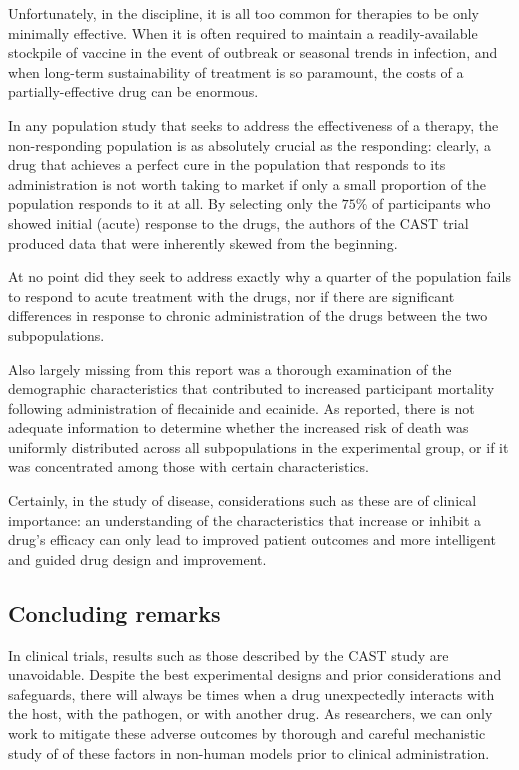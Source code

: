 \documentclass[11pt,final,twocolumn,twoside] {article}
\begin{document}
Unfortunately, in the discipline, it is all too common for therapies to be only minimally effective.\cite{Checkley} When it is often required to maintain a readily-available stockpile of vaccine in the event of outbreak or seasonal trends in infection, and when long-term sustainability of treatment is so paramount, the costs of a partially-effective drug can be enormous.\cite{Halloran}

In any population study that seeks to address the effectiveness of a therapy, the non-responding population is as absolutely crucial as the responding: clearly, a drug that achieves a perfect cure in the population that responds to its administration is not worth taking to market if only a small proportion of the population responds to it at all. By selecting only the $75\%$ of participants who showed initial (acute) response to the drugs, the authors of the CAST trial produced data that were inherently skewed from the beginning.

At no point did they seek to address exactly why a quarter of the population fails to respond to acute treatment with the drugs, nor if there are significant differences in response to chronic administration of the drugs between the two subpopulations.

Also largely missing from this report was a thorough examination of the demographic characteristics that contributed to increased participant mortality following administration of flecainide and ecainide. As reported, there is not adequate information to determine whether the increased risk of death was uniformly distributed across all subpopulations in the experimental group, or if it was concentrated among those with certain characteristics.

Certainly, in the study of disease, considerations such as these are of clinical importance: an understanding of the characteristics that increase or inhibit a drug's efficacy can only lead to improved patient outcomes and more intelligent and guided drug design and improvement.

\subsection*{Concluding remarks}

In clinical trials, results such as those described by the CAST study are unavoidable. Despite the best experimental designs and prior considerations and safeguards, there will always be times when a drug unexpectedly interacts with the host, with the pathogen, or with another drug. As researchers, we can only work to mitigate these adverse outcomes by thorough and careful mechanistic study of of these factors in non-human models prior to clinical administration.
\end{document}
